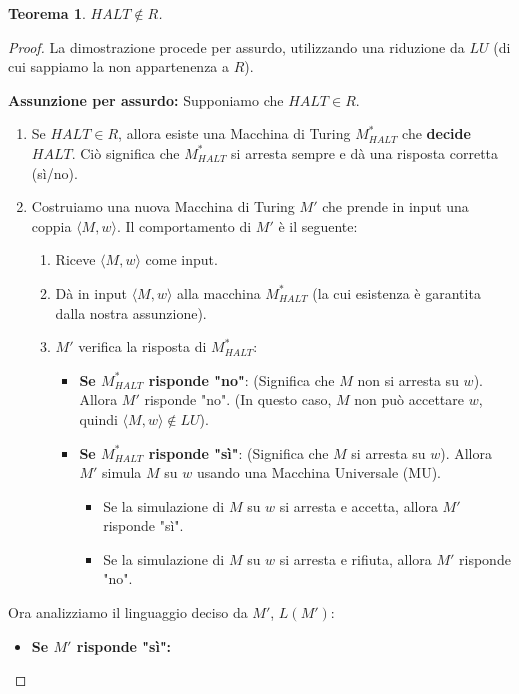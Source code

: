 \documentclass[a4paper, 11pt]{book} %
\newtheorem{theorem}{Teorema}[section]
\theoremstyle{definition}
\begin{document}
\begin{theorem}
$HALT \notin R$.
\end{theorem}
\begin{proof}
La dimostrazione procede per assurdo, utilizzando una riduzione da $LU$ (di cui sappiamo la non appartenenza a $R$).

\textbf{Assunzione per assurdo:} Supponiamo che $HALT \in R$.
\begin{enumerate}
    \item Se $HALT \in R$, allora esiste una Macchina di Turing $M_{HALT}^*$ che \textbf{decide} $HALT$. Ciò significa che $M_{HALT}^*$ si arresta sempre e dà una risposta corretta (sì/no).
    \item Costruiamo una nuova Macchina di Turing $M'$ che prende in input una coppia $\langle M, w \rangle$. Il comportamento di $M'$ è il seguente:
    \begin{enumerate}
        \item Riceve $\langle M, w \rangle$ come input.
        \item Dà in input $\langle M, w \rangle$ alla macchina $M_{HALT}^*$ (la cui esistenza è garantita dalla nostra assunzione).
        \item $M'$ verifica la risposta di $M_{HALT}^*$:
        \begin{itemize}
            \item \textbf{Se $M_{HALT}^*$ risponde "no"}: (Significa che $M$ non si arresta su $w$). Allora $M'$ risponde "no". (In questo caso, $M$ non può accettare $w$, quindi $\langle M, w \rangle \notin LU$).
            \item \textbf{Se $M_{HALT}^*$ risponde "sì"}: (Significa che $M$ si arresta su $w$). Allora $M'$ simula $M$ su $w$ usando una Macchina Universale (MU).
            \begin{itemize}
                \item Se la simulazione di $M$ su $w$ si arresta e accetta, allora $M'$ risponde "sì".
                \item Se la simulazione di $M$ su $w$ si arresta e rifiuta, allora $M'$ risponde "no".
            \end{itemize}
        \end{itemize}
    \end{enumerate}
\end{enumerate}
Ora analizziamo il linguaggio deciso da $M'$, $L(M')$:
\begin{itemize}
    \item \textbf{Se $M'$ risponde "sì":}

\end{itemize}
\end{proof}
\end{document}
